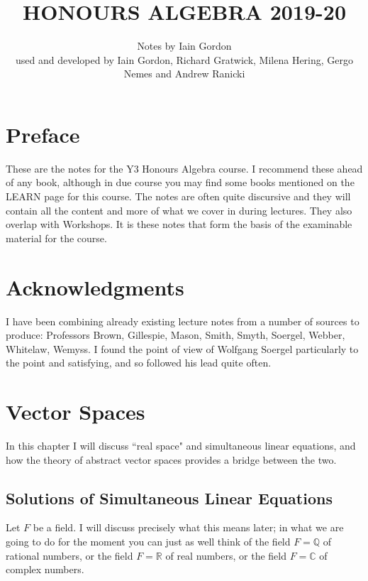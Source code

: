 \documentclass[11pt]{amsbook}
\theoremstyle{definition}
\begin{document}
\title{HONOURS ALGEBRA 2019-20}
\author{Notes by Iain Gordon \\[1ex]
used and developed by Iain Gordon, Richard Gratwick, Milena Hering, Gergo Nemes and Andrew Ranicki}


\maketitle

\frontmatter
\tableofcontents

\chapter*{Preface}
These are the notes for the Y3 Honours Algebra course. I recommend these ahead of any book, although in due course you may find some books mentioned on the LEARN page for this course. The notes are often quite discursive and they will contain all the content and more of what we cover in during lectures. They also overlap with Workshops. It is these notes that form the basis of the examinable material for the course.

\chapter*{Acknowledgments} I have been combining already existing lecture notes from a number of sources to produce: Professors Brown, Gillespie, Mason, Smith, Smyth, Soergel, Webber, Whitelaw, Wemyss. I found the point of view of Wolfgang Soergel particularly to the point and satisfying, and so followed his lead quite often.

\mainmatter


\chapter{Vector Spaces}
\label{ch:vectorspaces}
In this chapter I will discuss ``real space" and simultaneous linear equations, and how the theory of abstract vector spaces provides a bridge between the two.
\section{Solutions of Simultaneous Linear Equations}
\label{slas}

Let $F$ be a field. I will discuss precisely what this means later; in what we are going to do for the moment you can just as well think of the field $F = \mathbb{Q}$ of rational numbers, or the field $F=\mathbb{R}$ of real numbers, or the field $F = \mathbb{C}$ of complex numbers.
\end{document}
